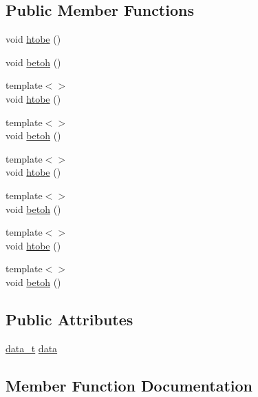 \subsection*{Public Member Functions}
\begin{DoxyCompactItemize}
\item 
void \hyperlink{structmui_1_1detail_1_1endian__converter_aef400975d1bd9a4a376711697d03239a}{htobe} ()
\item 
void \hyperlink{structmui_1_1detail_1_1endian__converter_a944e222e219959cd2fea153cac688c0e}{betoh} ()
\item 
{\footnotesize template$<$$>$ }\\void \hyperlink{structmui_1_1detail_1_1endian__converter_aa1a6a5a85e932b4a8b7aee1eef711497}{htobe} ()
\item 
{\footnotesize template$<$$>$ }\\void \hyperlink{structmui_1_1detail_1_1endian__converter_ab0f14ea48f1d5a0d961a9a971f693c45}{betoh} ()
\item 
{\footnotesize template$<$$>$ }\\void \hyperlink{structmui_1_1detail_1_1endian__converter_ab2ccc8fea0e71d43406c46069642e97f}{htobe} ()
\item 
{\footnotesize template$<$$>$ }\\void \hyperlink{structmui_1_1detail_1_1endian__converter_a8d4f028749a475d3f22350ebf34c0499}{betoh} ()
\item 
{\footnotesize template$<$$>$ }\\void \hyperlink{structmui_1_1detail_1_1endian__converter_a08c71b98455a03a114f28872c6fda6e8}{htobe} ()
\item 
{\footnotesize template$<$$>$ }\\void \hyperlink{structmui_1_1detail_1_1endian__converter_a900f063b5f8fa85113653d43ae450aad}{betoh} ()
\end{DoxyCompactItemize}
\subsection*{Public Attributes}
\begin{DoxyCompactItemize}
\item 
\hyperlink{unionmui_1_1detail_1_1endian__converter_1_1data__t}{data\+\_\+t} \hyperlink{structmui_1_1detail_1_1endian__converter_a1e68df4966d4777253a3540405b4fd25}{data}
\end{DoxyCompactItemize}


\subsection{Member Function Documentation}
\mbox{\label{structmui_1_1detail_1_1endian__converter_a944e222e219959cd2fea153cac688c0e}} 
